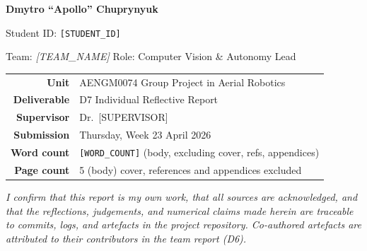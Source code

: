 \begin{titlepage}
  \vspace{1.6cm}

  {\large\bfseries Dmytro ``Apollo'' Chuprynyuk\par}
  \vspace{0.15cm}
  {\normalsize Student ID: \texttt{[STUDENT\_ID]}\par}
  \vspace{0.15cm}
  {\normalsize Team: \textit{[TEAM\_NAME]} \textbar{} Role: Computer Vision \& Autonomy Lead\par}

  \vspace{1.2cm}

  \begin{tabular}{rl}
    \textbf{Unit}           & AENGM0074 Group Project in Aerial Robotics \\
    \textbf{Deliverable}    & D7 \textemdash{} Individual Reflective Report \\
    \textbf{Supervisor}     & Dr.\ [SUPERVISOR] \\
    \textbf{Submission}     & Thursday, Week 23 \textemdash{} April 2026 \\
    \textbf{Word count}     & \texttt{[WORD\_COUNT]} (body, excluding cover, refs, appendices) \\
    \textbf{Page count}     & 5 (body) \textbar{} cover, references and appendices excluded \\
  \end{tabular}

  \vfill

  \begin{minipage}{0.88\textwidth}
    \footnotesize\centering
    \textit{I confirm that this report is my own work, that all sources are
    acknowledged, and that the reflections, judgements, and numerical claims
    made herein are traceable to commits, logs, and artefacts in the project
    repository. Co-authored artefacts are attributed to their contributors
    in the team report (D6).}
  \end{minipage}
  \vspace{0.4cm}

\end{titlepage}

\setcounter{page}{1}
